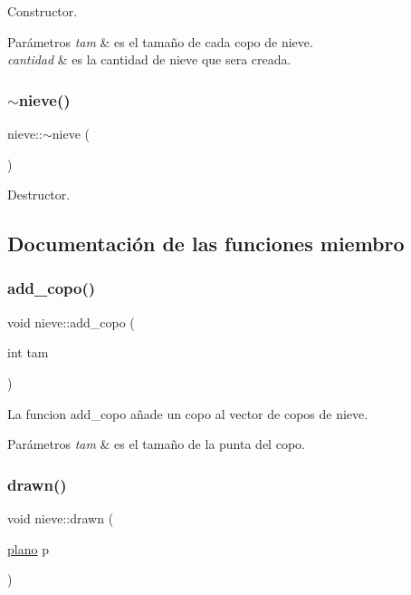 Constructor. 
\begin{DoxyParams}{Parámetros}
{\em tam} & es el tamaño de cada copo de nieve. \\
\hline
{\em cantidad} & es la cantidad de nieve que sera creada. \\
\hline
\end{DoxyParams}
\mbox{\label{classnieve_a554baea3727dc5650c5e8cec2f765e24}} 
\subsubsection{\texorpdfstring{$\sim$nieve()}{~nieve()}}
{\footnotesize\ttfamily nieve\+::$\sim$nieve (\begin{DoxyParamCaption}{ }\end{DoxyParamCaption})}

Destructor. 

\subsection{Documentación de las funciones miembro}
\mbox{\label{classnieve_a61ec704dc78cefdb6da47a8d24c59646}} 
\subsubsection{\texorpdfstring{add\+\_\+copo()}{add\_copo()}}
{\footnotesize\ttfamily void nieve\+::add\+\_\+copo (\begin{DoxyParamCaption}\item[{int}]{tam }\end{DoxyParamCaption})}

La funcion add\+\_\+copo añade un copo al vector de copos de nieve. 
\begin{DoxyParams}{Parámetros}
{\em tam} & es el tamaño de la punta del copo. \\
\hline
\end{DoxyParams}
\mbox{\label{classnieve_a0b49a0d373b8d3129fa11137ff6ce3e4}} 
\subsubsection{\texorpdfstring{drawn()}{drawn()}}
{\footnotesize\ttfamily void nieve\+::drawn (\begin{DoxyParamCaption}\item[{\hyperlink{classplano}{plano}}]{p }\end{DoxyParamCaption})}

